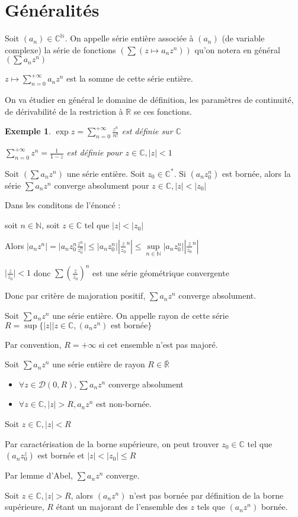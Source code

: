\documentclass[a4paper,12pt]{book}
\newcommand{\Def}[2]{\begin{tcolorbox}[sharp corners, colback=white,colframe=blue!90!black!75, title=Définition : #1]#2\end{tcolorbox}}
\newcommand{\Prop}[2]{\begin{tcolorbox}[sharp corners, colback=white,colframe=red!90!black!75, title=Proposition : #1]#2\end{tcolorbox}}
\newcommand{\Pre}[1]{\begin{tcolorbox}[sharp corners, colback=white,colframe=green!60!green!30!black!75, title=Preuve]#1\end{tcolorbox}}
\newtheorem{Exe}{Exemple}[section]
\def\R{\mathbb{R}}
\def\C{\mathbb{C}}
\def\N{\mathbb{N}}
\begin{document}
\section{Généralités}
\Def{}{Soit $(a_n)\in\C^\N$. On appelle série entière associée à $(a_n)$ (de variable complexe) la série de fonctions $\left(\sum (z\mapsto a_nz^n)\right)$ qu'on notera en général $\left(\sum a_nz^n\right)$
\par $z\mapsto \sum\limits_{n=0}^{+\infty}a_nz^n$ est la somme de cette série entière.}
On va étudier en général le domaine de définition, les paramètres de continuité, de dérivabilité de la restriction à $\R$ se ces fonctions. 
\begin{Exe}
$\exp{z}=\sum\limits_{n=0}^{+\infty}\frac{z^n}{n!}$ est définie sur $\C$
\par $\sum\limits_{n=0}^{+\infty}z^n=\frac{1}{1-z}$ est définie pour $z\in\C, \vert z\vert<1$
\end{Exe}
\Prop{Lemme d'Abel}{Soit $(\sum a_nz^n)$ une série entière. Soit $z_0\in\C^*$. Si $(a_nz_0^n)$ est bornée, alors la série $\sum a_nz^n$ converge absolument pour $z\in\C,\vert z\vert < \vert z_0\vert$}
\Pre{Dans les conditons de l'énoncé : \par soit $n\in\N$, soit $z\in\C$ tel que $\vert z\vert<\vert z_0\vert$ \par Alors $\vert a_nz^n\vert = \vert a_n z_0^n \frac{z^n}{z_0^n}\vert \leq \vert a_nz_0^n\vert \left\vert\frac{z}{z_0}^n\right\vert \leq \sup\limits_{n\in\N}\vert a_nz_0^n\vert \left\vert\frac{z}{z_0}^n\right\vert$
\par $\vert\frac{z}{z_0}\vert<1$ donc $\sum(\frac{z}{z_0})^n$ est une série géométrique convergente \par Donc par critère de majoration positif, $\sum a_nz^n$ converge absolument.}
\Def{Rayon de convergence}{Soit $\sum a_nz^n$ une série entière. On appelle rayon de cette série $R = \sup\{\vert z\vert | z\in\C, (a_nz^n)\text{ est bornée}\}$ \par Par convention, $R=+\infty$ si cet ensemble n'est pas majoré.}
\Prop{}{Soit $\sum a_nz^n$ une série entière de rayon $R\in\bar{\R}$ \begin{itemize} \item $\forall z\in\mathcal{D}(0,R), \sum a_nz^n$ converge absolument \item $\forall z\in\C, \vert z\vert>R, a_nz^n$ est non-bornée.\end{itemize}}
\Pre{Soit $z\in\C, \vert z\vert<R$ \par Par caractérisation de la borne supérieure, on peut trouver $z_0\in\C$ tel que $(a_nz_0^z)$ est bornée et $\vert z\vert < \vert z_0\vert\leq R$ \par Par lemme d'Abel, $\sum a_nz^n$ converge. \par Soit $z\in\C, \vert z\vert > R$, alors $(a_nz^n)$ n'est pas bornée par définition de la borne supérieure, $R$ étant un majorant de l'ensemble des $z$ tels que $(a_nz^n)$ bornée.}
\end{document}
